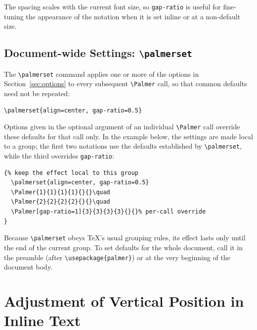 \documentclass[12pt]{ltjsarticle}
\begin{document}
The spacing scales with the current font size, so \texttt{gap-ratio} is useful for fine-tuning the appearance of the notation when it is set inline or at a non-default size.

\subsection{Document-wide Settings: \texttt{\textbackslash palmerset}}
\label{sec:palmerset}

The \verb|\palmerset| command applies one or more of the options in Section~\ref{sec:options} to every subsequent \verb|\Palmer| call, so that common defaults need not be repeated:

\begin{verbatim}
\palmerset{align=center, gap-ratio=0.5}
\end{verbatim}

Options given in the optional argument of an individual \verb|\Palmer| call override these defaults for that call only. In the example below, the settings are made local to a group; the first two notations use the defaults established by \verb|\palmerset|, while the third overrides \texttt{gap-ratio}:

\begin{verbatim}
{% keep the effect local to this group
  \palmerset{align=center, gap-ratio=0.5}
  \Palmer{1}{1}{1}{1}{}{}\quad
  \Palmer{2}{2}{2}{2}{}{}\quad
  \Palmer[gap-ratio=1]{3}{3}{3}{3}{}{}% per-call override
}
\end{verbatim}

\begin{quote}
{%
  \quad
  \quad
}
\end{quote}

\noindent Because \verb|\palmerset| obeys \TeX's usual grouping rules, its effect lasts only until the end of the current group. To set defaults for the whole document, call it in the preamble (after \verb|\usepackage{palmer}|) or at the very beginning of the document body.

\pagebreak %

\section{Adjustment of Vertical Position in Inline Text}
\label{sec:align}
\end{document}
